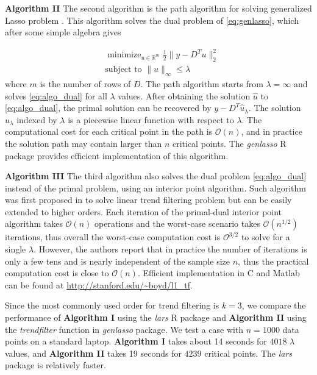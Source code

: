 \documentclass[a4paper]{article}
\newcommand{\RR}{\mathbb{R}}
\renewcommand{\cal}{\mathcal}
\DeclareMathOperator*{\minimize}{minimize}
\begin{document}
\textbf{Algorithm II} The second algorithm is the path algorithm for solving generalized Lasso problem \cite{harchaoui2010multiple,tibshirani2011solution}. This algorithm solves the dual problem of \eqref{eq:genlasso}, which after some simple algebra gives

\begin{equation}
\begin{aligned}
&\minimize_{u\in\RR^m} \frac{1}{2}\|y-D^Tu\|_2^2\\
&\mbox{subject to } \|u\|_\infty \leq \lambda
\label{eq:algo_dual}
\end{aligned}
\end{equation}
where $m$ is the number of rows of $D$. The path algorithm starts from $\lambda = \infty$ and solves \eqref{eq:algo_dual} for all $\lambda$ values. After obtaining the solution $\hat{u}$ to \eqref{eq:algo_dual}, the primal solution can be recovered by $y - D^T\hat{u}_\lambda$.
The solution $\hat{u}_\lambda$ indexed by $\lambda$ is a piecewise linear function with respect to $\lambda$. The computational cost for each critical point in the path is $\cal{O}(n)$, and in practice the solution path may contain larger than $n$ critical points. The \textit{genlasso} R package provides efficient implementation of this algorithm.

\textbf{Algorithm III} The third algorithm also solves the dual problem \eqref{eq:algo_dual} instead of the primal problem, using an interior point algorithm. Such algorithm was first proposed in \cite{kim2009ell_1} to solve linear trend filtering problem but can be easily extended to higher orders. Each iteration of the primal-dual interior point algorithm takes $\cal{O}(n)$ operations and the worst-case scenario takes $\cal{O}(n^{1/2})$ iterations, thus overall the worst-case computation cost is $\cal{O}^{3/2}$ to solve for a single $\lambda$. However, the authors report that in practice the number of iterations is only a few tens and is nearly independent of the sample size $n$, thus the practical computation cost is close to $\cal{O}(n)$. Efficient implementation in C and Matlab can be found at \url{http://stanford.edu/~boyd/l1_tf}. 

Since the most commonly used order for trend filtering is $k = 3$, we compare the performance of \textbf{Algorithm I} using the \textit{lars} R package and \textbf{Algorithm II} using the \textit{trendfilter} function in \textit{genlasso} package. We test a case with $n = 1000$ data points on a standard laptop. \textbf{Algorithm I} takes about 14 seconds for $4018$ $\lambda$ values, and \textbf{Algorithm II} takes 19 seconds for $4239$ critical points. The \textit{lars} package is relatively faster. 
\end{document}
